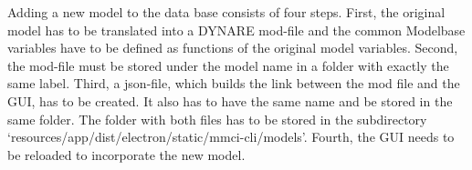 Adding a new model to the data base consists of four steps. First, the original model has to be translated into a DYNARE mod-file and the common Modelbase variables have to be defined as functions of the original model variables. Second, the mod-file must be stored under the model name in a folder with exactly the same label. Third, a json-file, which builds the link between the mod file and the GUI, has to be created. It also has to have the same  name and be stored in the same folder. The folder with both files has to be stored in the subdirectory `resources/app/dist/electron/static/mmci-cli/models'. Fourth, the GUI needs to be reloaded to incorporate the new model.



